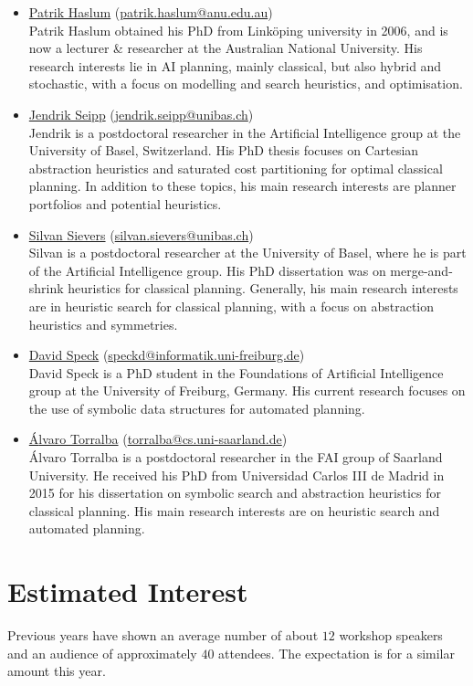 \documentclass[10pt]{article}
\begin{document}
\begin{itemize}
\item \href{https://users.cecs.anu.edu.au/~patrik/}{Patrik Haslum}
(\href{mailto:patrik.haslum@anu.edu.au}{patrik.haslum@anu.edu.au})\\
Patrik Haslum obtained his PhD from Link\"oping university in 2006,
and is now a lecturer \& researcher at the Australian National
University. His research interests lie in AI planning, mainly classical,
but also hybrid and stochastic, with a focus on modelling and search
heuristics, and optimisation.

\item \href{https://ai.dmi.unibas.ch/people/seipp}{Jendrik Seipp}
(\href{mailto:jendrik.seipp@unibas.ch}{jendrik.seipp@unibas.ch})\\
Jendrik is a postdoctoral researcher in the Artificial Intelligence
group at the University of Basel, Switzerland. His PhD thesis focuses
on Cartesian abstraction heuristics and saturated cost partitioning
for optimal classical planning. In addition to these topics, his main
research interests are planner portfolios and potential heuristics.

\item \href{https://ai.dmi.unibas.ch/people/}{Silvan Sievers}
(\href{mailto:silvan.sievers@unibas.ch}{silvan.sievers@unibas.ch})\\
Silvan is a postdoctoral researcher at the University of Basel, where he is
part of the Artificial Intelligence group. His PhD dissertation was on
merge-and-shrink heuristics for classical planning. Generally, his main
research interests are in heuristic search for classical planning, with a focus
on abstraction heuristics and symmetries.

\item \href{http://}{David Speck}
(\href{mailto:speckd@informatik.uni-freiburg.de}{speckd@informatik.uni-freiburg.de})\\
David Speck is a PhD student in the Foundations of Artificial Intelligence
group at the University of Freiburg, Germany. His current research focuses on
the use of symbolic data structures for automated planning.

\item \href{http://}{{\'A}lvaro Torralba}
  (\href{mailto:torralba@cs.uni-saarland.de}{torralba@cs.uni-saarland.de})\\ \'Alvaro
  Torralba is a postdoctoral researcher in the FAI group of Saarland University. He
  received his PhD from Universidad Carlos III de Madrid in 2015 for his dissertation on
  symbolic search and abstraction heuristics for classical planning. His main research
  interests are on heuristic search and automated planning.


\end{itemize}

\section*{Estimated Interest}
Previous years have shown an average number of about $12$ workshop
speakers and an audience of approximately $40$ attendees. The
expectation is for a similar amount this year.
\end{document}
